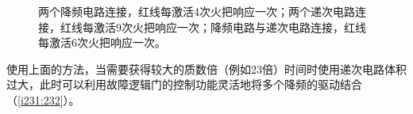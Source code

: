 \begin{figure}[!h]
\begin{center}
\qquad
{}
\qquad
{}
\end{center}
\caption{\protect{}两个降频电路连接，红线每激活4次火把响应一次；\protect{}两个递次电路连接，红线每激活9次火把响应一次；\protect{}降频电路与递次电路连接，红线每激活6次火把响应一次。}
\label{i223:228}
\end{figure}

使用上面的方法，当需要获得较大的质数倍（例如23倍）时间时使用递次电路体积过大，此时可以利用故障逻辑门的控制功能灵活地将多个降频的驱动结合（\autoref{i231:232}）。

